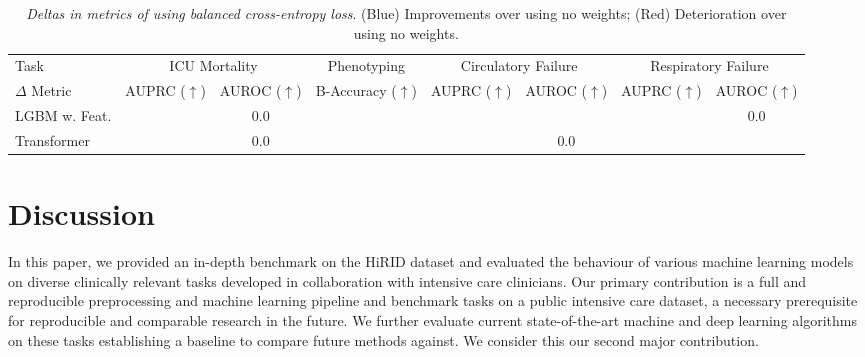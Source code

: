\documentclass{article}
\begin{document}
\begin{table}[!ht]
    \centering
    \footnotesize
    \setlength\tabcolsep{1.5pt}
    \caption{\textit{Deltas in metrics of using balanced cross-entropy loss}. (Blue) Improvements over using no weights; (Red) Deterioration over using no weights.   }
\begin{tabular}{l|cc|c|cc|cc}
\toprule
Task & \multicolumn{2}{c|}{ICU Mortality} & Phenotyping & \multicolumn{2}{c|}{Circulatory Failure} & \multicolumn{2}{c}{Respiratory Failure} \\
$\Delta$ Metric & AUPRC ($\uparrow$) & AUROC ($\uparrow$) & B-Accuracy ($\uparrow$) &      AUPRC ($\uparrow$) & AUROC ($\uparrow$) &  AUPRC ($\uparrow$) & AUROC ($\uparrow$) \\
\midrule
LGBM w. Feat. &               \color{red}{-1.3} &                0.0 &                    \color{RoyalBlue}{+4.3} &                    \color{red}{-4.2} &                \color{red}{-2.6} &               \color{RoyalBlue}{0.1} &               0.0 \\
Transformer &               \color{red}{-2.6} &                0.0 &                    \color{RoyalBlue}{+4.0} &                    \color{red}{-0.9} &               0.0 &                \color{red}{-0.1} &               \color{red}{-0.1} \\
\bottomrule
\end{tabular}

    \label{tab:weighting-impact}
\end{table}




 \section{Discussion}\label{disc}

In this paper, we provided an in-depth benchmark on the HiRID dataset and evaluated the behaviour of various machine learning models on diverse clinically relevant tasks developed in collaboration with intensive care clinicians. Our primary contribution is a full and reproducible preprocessing and machine learning pipeline and benchmark tasks on a public intensive care dataset, a necessary prerequisite for reproducible and comparable research in the future. We further evaluate current state-of-the-art machine and deep learning algorithms on these tasks establishing a baseline to compare future methods against. We consider this our second major contribution. 
\end{document}
